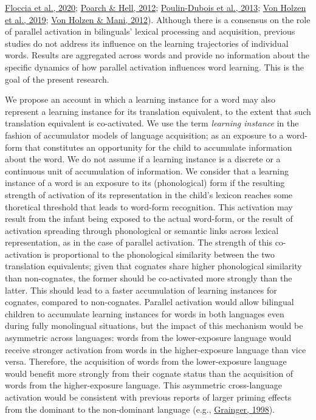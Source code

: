 \documentclass[
]{article}
\begin{document}
\protect\hyperlink{ref-floccia2020translation}{Floccia et al., 2020};
\protect\hyperlink{ref-poarch2012crosslanguage}{Poarch \& Hell, 2012};
\protect\hyperlink{ref-poulin-dubois2013lexical}{Poulin-Dubois et al.,
2013}; \protect\hyperlink{ref-vonholzen2019impact}{Von Holzen et al.,
2019}; \protect\hyperlink{ref-vonholzen2012language}{Von Holzen \& Mani,
2012}). Although there is a consensus on the role of parallel activation
in bilinguals' lexical processing and acquisition, previous studies do
not address its influence on the learning trajectories of individual
words. Results are aggregated across words and provide no information
about the specific dynamics of how parallel activation influences word
learning. This is the goal of the present research.

We propose an account in which a learning instance for a word may also
represent a learning instance for its translation equivalent, to the
extent that such translation equivalent is co-activated. We use the term
\emph{learning instance} in the fashion of accumulator models of
language acquisition; as an exposure to a word-form that constitutes an
opportunity for the child to accumulate information about the word. We
do not assume if a learning instance is a discrete or a continuous unit
of accumulation of information. We consider that a learning instance of
a word is an exposure to its (phonological) form if the resulting
strength of activation of its representation in the child's lexicon
reaches some thoretical threshold that leads to word-form recognition.
This activation may result from the infant being exposed to the actual
word-form, or the result of activation spreading through phonological or
semantic links across lexical representation, as in the case of parallel
activation. The strength of this co-activation is proportional to the
phonological similarity between the two translation equivalents; given
that cognates share higher phonological similarity than non-cognates,
the former should be co-activated more strongly than the latter. This
should lead to a faster accumulation of learning instances for cognates,
compared to non-cognates. Parallel activation would allow bilingual
children to accumulate learning instances for words in both languages
even during fully monolingual situations, but the impact of this
mechanism would be asymmetric across languages: words from the
lower-exposure language would receive stronger activation from words in
the higher-exposure language than vice versa. Therefore, the acquisition
of words from the lower-exposure language would benefit more strongly
from their cognate status than the acquisition of words from the
higher-exposure language. This asymmetric cross-language activation
would be consistent with previous reports of larger priming effects from
the dominant to the non-dominant language (e.g.,
\protect\hyperlink{ref-grainger1998masked}{Grainger, 1998}).
\end{document}
